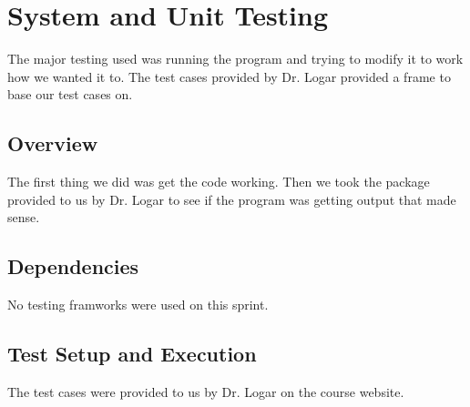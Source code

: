 
\chapter{System  and Unit Testing}

The major testing used was running the program and trying to modify it to work how
we wanted it to.   The test cases provided by Dr. Logar provided a frame to base our
test cases on.

\section{Overview}
The first thing we did was get the code working.   Then we took the package provided to us
by Dr. Logar to see if the program was getting output that made sense. 



\section{Dependencies}
No testing framworks were used on this sprint.


\section{Test Setup and Execution}
The test cases were provided to us by Dr. Logar on the course website. 

